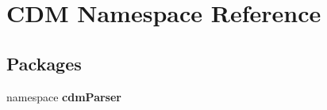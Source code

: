 \section{\-C\-D\-M \-Namespace \-Reference}
\label{namespace_c_d_m}
\subsection*{\-Packages}
\begin{DoxyCompactItemize}
\item 
namespace {\bf cdm\-Parser}
\end{DoxyCompactItemize}

